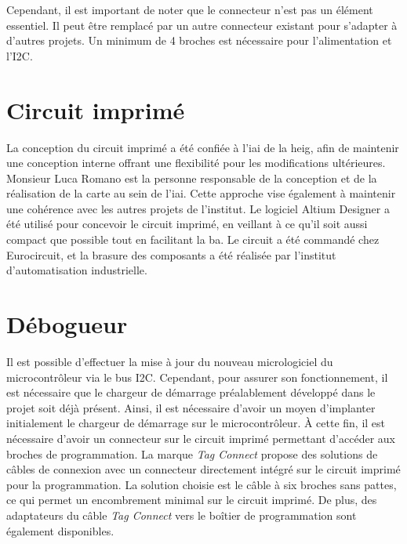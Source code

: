 Cependant, il est important de noter que le connecteur n'est pas un élément essentiel. Il peut être remplacé par un autre connecteur existant pour s'adapter à d'autres projets. Un minimum de 4 broches est nécessaire pour l'alimentation et l'I2C.

\section{Circuit imprimé}

La conception du circuit imprimé a été confiée à l'\gls{iai} de la \gls{heig}, afin de maintenir une conception interne offrant une flexibilité pour les modifications ultérieures.
Monsieur Luca Romano est la personne responsable de la conception et de la réalisation de la carte au sein de l'\gls{iai}. Cette approche vise également à maintenir une cohérence avec les autres projets de l'institut.
Le logiciel Altium Designer a été utilisé pour concevoir le circuit imprimé, en veillant à ce qu'il soit aussi compact que possible tout en facilitant la ba.
Le circuit a été commandé chez Eurocircuit, et la brasure des composants a été réalisée par l'institut d'automatisation industrielle.

\section{Débogueur}

Il est possible d'effectuer la mise à jour du nouveau micrologiciel du microcontrôleur via le bus I2C.
Cependant, pour assurer son fonctionnement, il est nécessaire que le chargeur de démarrage préalablement développé dans le projet soit déjà présent.
Ainsi, il est nécessaire d'avoir un moyen d'implanter initialement le chargeur de démarrage sur le microcontrôleur.
À cette fin, il est nécessaire d'avoir un connecteur sur le circuit imprimé permettant d'accéder aux broches de programmation.
La marque \textit{Tag Connect} propose des solutions de câbles de connexion avec un connecteur directement intégré sur le circuit imprimé pour la programmation.
La solution choisie est le câble à six broches sans pattes, ce qui permet un encombrement minimal sur le circuit imprimé.
De plus, des adaptateurs du câble \textit{Tag Connect} vers le boîtier de programmation sont également disponibles.

